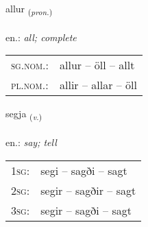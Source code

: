 \documentclass[frontgrid, backgrid]{flacards}\usepackage[]{graphicx}\usepackage[]{xcolor}
\begin{document}
\renewcommand{\blhead}{\vskip5pt {\small\bfseries\footnotesize Fornafn | Pronoun }}
\renewcommand{\bcfoot}{\vskip5pt \hspace{2pt}{\small\bfseries\footnotesize 1K}}


{allur \small{\textsubscript{(\textit{pron.})}} \\[1ex] %
\textphonetic{[atlʏr]} \\
en.: \emph{all; complete} \\  [2ex]
\renewcommand*{\arraystretch}{0.8}
\begin{tabular}{ll}
\textsc{sg.nom.}: & allur  --  öll -- allt \\ 
\textsc{pl.nom.}: & allir -- allar -- öll
\end{tabular}
}

\renewcommand{\flhead}{\vskip5pt \fboxsep=0pt {\small\bfseries\footnotesize Sagnorð | Verb}}
\renewcommand{\fcfoot}{\vskip5pt \fboxsep=0pt \hspace{2pt}{\small\bfseries\footnotesize 1K}}

\renewcommand{\blhead}{\vskip5pt {\small\bfseries\footnotesize Sagnorð | Verb }}
\renewcommand{\bcfoot}{\vskip5pt \hspace{2pt}{\small\bfseries\footnotesize 1K}}


{segja \small{\textsubscript{(\textit{v.})}} \\[1ex] %
\textphonetic{[seija]} \\
en.: \emph{say; tell} \\  [2ex]
\renewcommand*{\arraystretch}{0.8}
\begin{tabular}{p{1cm}l}
\textsc{1sg}: & segi -- sagði -- sagt \\ 
\textsc{2sg}: & segir -- sagðir -- sagt \\ 
\textsc{3sg}: & segir -- sagði -- sagt \\ 
\end{tabular}
}

\renewcommand{\flhead}{\vskip5pt \fboxsep=0pt {\small\bfseries\footnotesize Fornafn | Pronoun}}
\renewcommand{\fcfoot}{\vskip5pt \fboxsep=0pt \hspace{2pt}{\small\bfseries\footnotesize 1K}}
\end{document}
